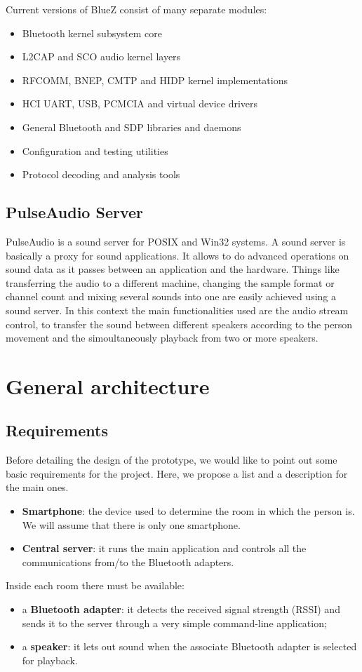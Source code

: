 \documentclass[conference]{IEEEtran}
\begin{document}
Current versions of BlueZ consist of many separate modules:
\begin{itemize}
\item Bluetooth kernel subsystem core
\item L2CAP and SCO audio kernel layers
\item RFCOMM, BNEP, CMTP and HIDP kernel implementations
\item HCI UART, USB, PCMCIA and virtual device drivers
\item General Bluetooth and SDP libraries and daemons
\item Configuration and testing utilities
\item Protocol decoding and analysis tools
\end{itemize}

\subsection{PulseAudio Server}
PulseAudio is a sound server for POSIX and Win32 systems. A sound server is basically a proxy for sound applications. It allows to do advanced operations on sound data as it passes between an application and the hardware. Things like transferring the audio to a different machine, changing the sample format or channel count and mixing several sounds into one are easily achieved using a sound server. In this context the main functionalities used are the audio stream control, to transfer the sound between different speakers according to the person movement and the simoultaneously playback from two or more speakers.

\section{General architecture}

\subsection{Requirements}
Before detailing the design of the prototype, we would like to point out some basic requirements for the project. Here, we propose a list and a description for the main ones.
\begin{itemize}
\item{\textbf{Smartphone}:} the device used to determine the room in which the person is. We will assume that there is only one smartphone.
\item{\textbf{Central server}:} it runs the main application and controls all the communications from/to the Bluetooth adapters.
\end{itemize}
Inside each room there must be available:
\begin{itemize}
\item{a \textbf{Bluetooth adapter}:} it detects the received signal strength (RSSI) and sends it to the server through a very simple command-line application;
\item{a \textbf{speaker}:} it lets out sound when the associate Bluetooth adapter is selected for playback.
\end{itemize}
\end{document}
